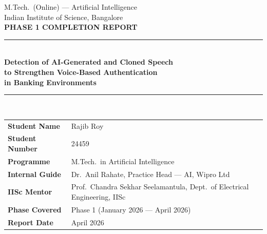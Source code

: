 \documentclass[12pt,a4paper]{report}
\begin{document}

\begin{titlepage}
  \thispagestyle{empty}
  \begin{center}
    \vspace*{1cm}
    {\large\color{darkblue}M.Tech.\ (Online) --- Artificial Intelligence}\\[4pt]
    {\large\color{darkblue}Indian Institute of Science, Bangalore}\\[2cm]
    {\Huge\bfseries\color{darkblue}PHASE 1 COMPLETION REPORT}\\[1cm]
    {\color{medblue}\rule{\linewidth}{2pt}}\\[0.5cm]
    {\LARGE\bfseries\color{medblue}
      Detection of AI-Generated and Cloned Speech\\[6pt]
      to Strengthen Voice-Based Authentication\\[6pt]
      in Banking Environments}\\[0.4cm]
    {\color{medblue}\rule{\linewidth}{1pt}}\\[1.8cm]
    \begin{tabular}{@{}L{4.5cm}L{9cm}@{}}
      \textbf{Student Name}   & Rajib Roy \\
          \textbf{Student Number} & 24459 \\
      \textbf{Programme}      & M.Tech.\ in Artificial Intelligence \\
          \textbf{Internal Guide} & Dr.\ Anil Rahate, Practice Head --- AI, Wipro Ltd \\
      \textbf{IISc Mentor}    & Prof.\ Chandra Sekhar Seelamantula,
                                                     Dept.\ of Electrical Engineering, IISc \\
          \textbf{Phase Covered}  & Phase 1 \quad (January 2026 --- April 2026) \\
      \textbf{Report Date}    & April 2026 \\
    \end{tabular}
  \end{center}
\end{titlepage}

\tableofcontents
\listoffigures
\clearpage
{}

\end{document}
